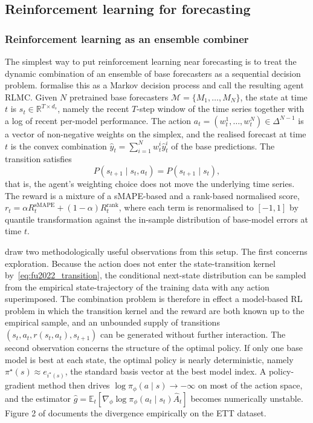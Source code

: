 \subsection{Reinforcement learning for forecasting}
\label{sec:rl_for_forecasting}

\subsubsection{Reinforcement learning as an ensemble combiner}
\label{sec:rl_ensemble}

The simplest way to put reinforcement learning near forecasting is to treat the
dynamic combination of an ensemble of base forecasters as a sequential decision
problem. \citet{Fu2022} formalise this as a Markov decision process and call the
resulting agent RLMC. Given $N$ pretrained base forecasters
$\mathcal M = \{M_1, \dots, M_N\}$, the state at time $t$ is
$s_t \in \mathbb R^{T \times d_s}$, namely the recent $T$-step window of the time
series together with a log of recent per-model performance. The action
$a_t = (w^1_t, \dots, w^N_t) \in \Delta^{N-1}$ is a vector of non-negative weights
on the simplex, and the realised forecast at time $t$ is the convex combination
$\hat y_t = \sum_{i=1}^N w^i_t \hat y^i_t$ of the base predictions. The transition
satisfies
\begin{equation}
P(s_{t+1} \mid s_t, a_t) = P(s_{t+1} \mid s_t),
\label{eq:fu2022_transition}
\end{equation}
that is, the agent's weighting choice does not move the underlying time series.
The reward is a mixture of a sMAPE-based and a rank-based normalised score,
$r_t = \alpha R^{\mathrm{sMAPE}}_t + (1-\alpha) R^{\mathrm{rank}}_t$, where each
term is renormalised to $[-1, 1]$ by quantile transformation against the
in-sample distribution of base-model errors at time $t$.

\citet{Fu2022} draw two methodologically useful observations from this setup. The
first concerns exploration. Because the action does not enter the state-transition
kernel by~\eqref{eq:fu2022_transition}, the conditional next-state distribution can
be sampled from the empirical state-trajectory of the training data with any
action superimposed. The combination problem is therefore in effect a model-based
RL problem in which the transition kernel and the reward are both known up to the
empirical sample, and an unbounded supply of transitions
$(s_t, a_t, r(s_t, a_t), s_{t+1})$ can be generated without further interaction. The
second observation concerns the structure of the optimal policy. If only one base
model is best at each state, the optimal policy is nearly deterministic, namely
$\pi^\star(s) \approx e_{i^\star(s)}$, the standard basis vector at the best model
index. A policy-gradient method then drives $\log \pi_\phi(a \mid s) \to -\infty$
on most of the action space, and the estimator
$\hat g = \mathbb E_t[\nabla_\phi \log \pi_\phi(a_t \mid s_t) \hat A_t]$ becomes
numerically unstable. Figure 2 of \citet{Fu2022} documents the divergence
empirically on the ETT dataset.

